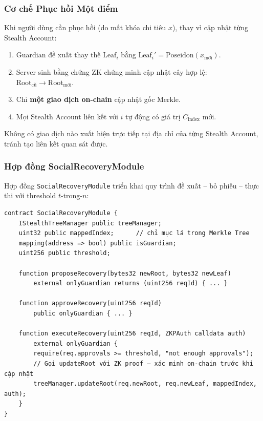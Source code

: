 \documentclass[../DoAn.tex]{subfiles}
\begin{document}
\subsubsection{Cơ chế Phục hồi Một điểm}

Khi người dùng cần phục hồi (do mất khóa chi tiêu $x$), thay vì cập nhật từng Stealth Account:

\begin{enumerate}
    \item Guardian đề xuất thay thế $\text{Leaf}_i$ bằng $\text{Leaf}_i' = \text{Poseidon}(x_{\text{mới}})$.
    \item Server sinh bằng chứng ZK chứng minh cập nhật cây hợp lệ: $\text{Root}_{\text{cũ}} \to \text{Root}_{\text{mới}}$.
    \item Chỉ \textbf{một giao dịch on-chain} cập nhật gốc Merkle.
    \item Mọi Stealth Account liên kết với $i$ tự động có giá trị $C_{\text{index}}$ mới.
\end{enumerate}

Không có giao dịch nào xuất hiện trực tiếp tại địa chỉ của từng Stealth Account, tránh tạo liên kết quan sát được.

\subsubsection{Hợp đồng SocialRecoveryModule}

Hợp đồng \texttt{SocialRecoveryModule} triển khai quy trình đề xuất -- bỏ phiếu -- thực thi với threshold $t$-trong-$n$:

\begin{verbatim}
contract SocialRecoveryModule {
    IStealthTreeManager public treeManager;
    uint32 public mappedIndex;      // chỉ mục lá trong Merkle Tree
    mapping(address => bool) public isGuardian;
    uint256 public threshold;

    function proposeRecovery(bytes32 newRoot, bytes32 newLeaf)
        external onlyGuardian returns (uint256 reqId) { ... }

    function approveRecovery(uint256 reqId)
        public onlyGuardian { ... }

    function executeRecovery(uint256 reqId, ZKPAuth calldata auth)
        external onlyGuardian {
        require(req.approvals >= threshold, "not enough approvals");
        // Gọi updateRoot với ZK proof — xác minh on-chain trước khi cập nhật
        treeManager.updateRoot(req.newRoot, req.newLeaf, mappedIndex, auth);
    }
}
\end{verbatim}
\end{document}
